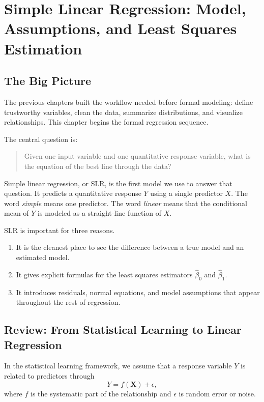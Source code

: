 \chapter{Simple Linear Regression: Model, Assumptions, and Least Squares Estimation}
\label{chap:slr-model-assumptions-lse}

\section{The Big Picture}

The previous chapters built the workflow needed before formal modeling: define trustworthy variables, clean the data, summarize distributions, and visualize relationships.  This chapter begins the formal regression sequence.

The central question is:
\begin{quote}
  Given one input variable and one quantitative response variable, what is the equation of the best line through the data?
\end{quote}

Simple linear regression, or SLR, is the first model we use to answer that question.  It predicts a quantitative response $Y$ using a single predictor $X$.  The word \emph{simple} means one predictor.  The word \emph{linear} means that the conditional mean of $Y$ is modeled as a straight-line function of $X$.

SLR is important for three reasons.
\begin{enumerate}
  \item It is the cleanest place to see the difference between a true model and an estimated model.
  \item It gives explicit formulas for the least squares estimators $\widehat{\beta}_0$ and $\widehat{\beta}_1$.
  \item It introduces residuals, normal equations, and model assumptions that appear throughout the rest of regression.
\end{enumerate}

\section{Review: From Statistical Learning to Linear Regression}

In the statistical learning framework, we assume that a response variable $Y$ is related to predictors through
\begin{equation}
  Y=f(\mathbf{X})+\epsilon,
  \label{eq:ch5-general-learning-model}
\end{equation}
where $f$ is the systematic part of the relationship and $\epsilon$ is random error or noise.

